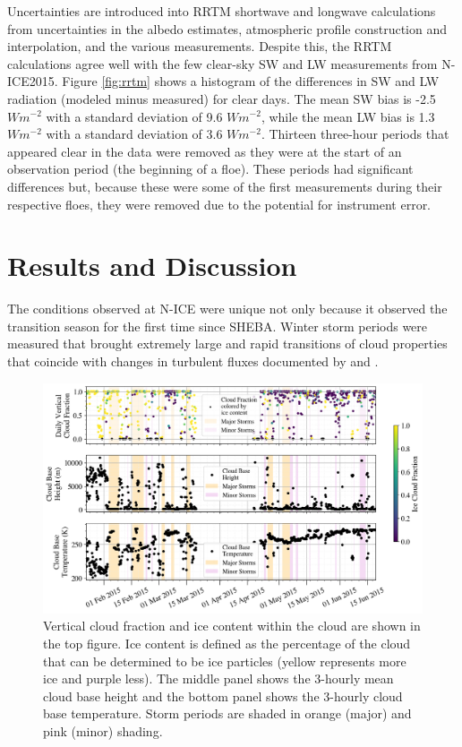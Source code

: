 Uncertainties are introduced into RRTM shortwave and longwave calculations from uncertainties in the albedo estimates, atmospheric profile construction and interpolation, and the various measurements. Despite this, the RRTM calculations agree well with the few clear-sky SW and LW measurements from N-ICE2015. Figure \ref{fig:rrtm} shows a histogram of the differences in SW and LW radiation (modeled minus measured) for clear days. The mean SW bias is -2.5 $W m^{-2}$ with a standard deviation of 9.6 $W m^{-2}$, while the mean LW bias is 1.3 $W m^{-2}$ with a standard deviation of 3.6 $W m^{-2}$. Thirteen three-hour periods that appeared clear in the data were removed as they were at the start of an observation period (the beginning of a floe). These periods had significant differences but, because these were some of the first measurements during their respective floes, they were removed due to the potential for instrument error.

\section{Results and Discussion}
The conditions observed at N-ICE were unique not only because it observed the transition season for the first time since SHEBA. Winter storm periods were measured that brought extremely large and rapid transitions of cloud properties that coincide with changes in turbulent fluxes documented by \citet{walden:2017} and \citet{graham:2017:comp}. 

\begin{figure}[t!]
    \centering
    \includegraphics[width=1\linewidth]{figures/chapter4/CloudSummary.png}
    \caption[Cloud fraction and phase, height, and temperature time series.]{Vertical cloud fraction and ice content within the cloud are shown in the top figure. Ice content is defined as the percentage of the cloud that can be determined to be ice particles (yellow represents more ice and purple less). The middle panel shows the 3-hourly mean cloud base height and the bottom panel shows the 3-hourly cloud base temperature. Storm periods are shaded in orange (major) and pink (minor) shading.}
    \label{fig:cloudmacro}
\end{figure}

